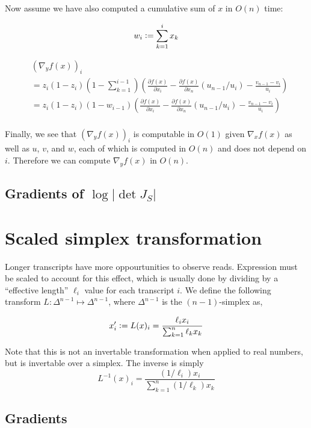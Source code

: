 \documentclass{article}
\newcommand{\defeq}{\vcentcolon=}
\begin{document}
Now assume we have also computed a cumulative sum of $x$ in $O(n)$ time:

$$w_i \defeq \sum_{k=1}^i x_k$$

\begin{align}
&\left( \nabla_y f(x) \right)_i \\
&=
z_i (1 - z_i) \left(1 - \sum_{k=1}^{i-1} \right) \left(
\frac{\partial f(x)}{\partial x_i}
- \frac{\partial f(x)}{\partial x_n} (u_{n-1} / u_i)
- \frac{v_{n-1} - v_i}{u_i} \right) \\
&=
z_i (1 - z_i) (1 - w_{i-1} ) \left(
\frac{\partial f(x)}{\partial x_i}
- \frac{\partial f(x)}{\partial x_n} (u_{n-1} / u_i)
- \frac{v_{n-1} - v_i}{u_i} \right) \\
\end{align}

Finally, we see that $\left( \nabla_y f(x) \right)_i$ is computable in $O(1)$
given $\nabla_x f(x)$ as well as $u$, $v$, and $w$, each of which is computed in
$O(n)$ and does not depend on $i$. Therefore we can compute $\nabla_y f(x)$ in
$O(n)$.


\subsection{Gradients of $\log |\det J_{S}|$}


\section{Scaled simplex transformation}

Longer transcripts have more oppourtunities to observe reads. Expression must be
scaled to account for this effect, which is usually done by dividing by a
``effective length'' $\ell_i$ value for each transcript $i$. We define the
following transform $L: \Delta^{n-1} \mapsto \Delta^{n-1}$, where $\Delta^{n-1}$
is the $(n-1)$-simplex as,

$$
x'_i \defeq L(x)_i = \frac{\ell_i x_i}{\sum_{k=1}^{n} \ell_k x_k}
$$

Note that this is not an invertable transformation when applied to real numbers,
but is invertable over a simplex. The inverse is simply $$L^{-1}(x)_i =
\frac{(1/\ell_i) x_i}{\sum_{k=1}^{n} (1/\ell_k) x_k}$$

\subsection{Gradients}\label{efflen_gradients}
\end{document}
